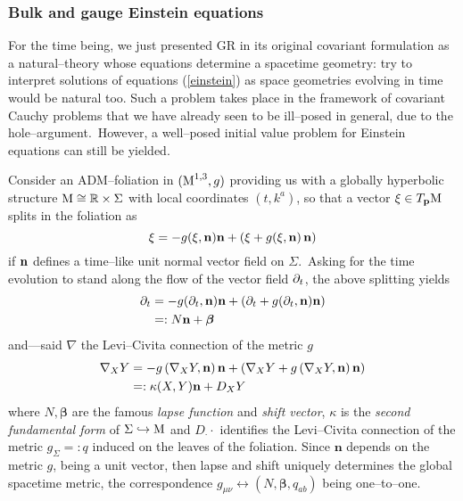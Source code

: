
\subsubsection{Bulk and gauge Einstein equations}\label{canonical_GR}

For the time being, we just presented GR in its original covariant formulation as a natural--theory whose equations determine a spacetime geometry: try to interpret solutions of equations (\ref{einstein}) as space geometries evolving in time would be natural too. Such a problem takes place in the framework of covariant Cauchy problems that we have already seen to be ill--posed in general, due to the hole--argument.\, However, a well--posed initial value problem for Einstein equations can still be yielded.

Consider an ADM--foliation in $(\text{\normalfont M}^{1,3},g)$ providing us with a globally hyperbolic structure $\text{\normalfont M}\cong\mathbb{R}\times\Sigma$ with local coordinates $(t,k^a)$, so that a vector $\xi\in T_{\mathbf{p}}\text{\normalfont M}$ splits in the foliation as
$$\xi=-g(\xi,\mathbf{n})\mathbf{n}+(\xi+g(\xi,\mathbf{n})\,\mathbf{n})$$
if $\mathbf{n}$ defines a time--like unit normal vector field on $\Sigma$.\, Asking for the time evolution to stand along the flow of the vector field $\partial_t$, the above splitting yields
\begin{align*}
    \partial_t&=-g(\partial_t,\mathbf{n})\mathbf{n}+(\partial_t+g(\partial_t,\mathbf{n})\mathbf{n})\\
    &=:N\mathbf{n}+\boldsymbol{\beta}
\end{align*}
and---said $\nabla$ the Levi--Civita connection of the metric $g$
\begin{align*}
    \nabla_XY&=-g\left(\nabla_XY,\mathbf{n}\right)\mathbf{n}+\left(\nabla_XY+g\left(\nabla_XY,\mathbf{n}\right)\mathbf{n}\right)\\
    &=:\kappa(X,Y)\mathbf{n}+D_XY
\end{align*}
where $N,\boldsymbol{\beta}$ are the famous \emph{lapse function} and \emph{shift vector}, $\kappa$ is the \emph{second fundamental form} of $\Sigma\hookrightarrow\text{\normalfont M}$ and $D_\cdot\cdot$ identifies the Levi--Civita connection of the metric $g_\Sigma=:q$ induced on the leaves of the foliation. Since $\mathbf{n}$ depends on the metric $g$, being a unit vector, then lapse and shift uniquely determines the global spacetime metric, the correspondence $g_{\mu\nu}\leftrightarrow(N,\boldsymbol{\beta},q_{ab})$ being one--to--one.

